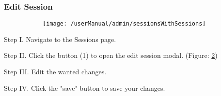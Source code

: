\subsubsection{Edit Session}
\begin{figure}[H]
    \centering
    \begin{subfigure}{\linewidth}
        \texttt{[image: /userManual/admin/sessionsWithSessions]}
       	\caption{}
		\label{fig:sessionsWithSessions}	
    \end{subfigure}
\end{figure}
\begin{userManualItemlist}
	\item[Step I.] Navigate to the Sessions page.
	\item[Step II.] Click the button (1) to open the edit session modal. (Figure: \ref{fig:sessionsWithSessions})
	\item[Step III.] Edit the wanted changes.
	\item[Step IV.] Click the "save" button to save your changes.
\end{userManualItemlist}